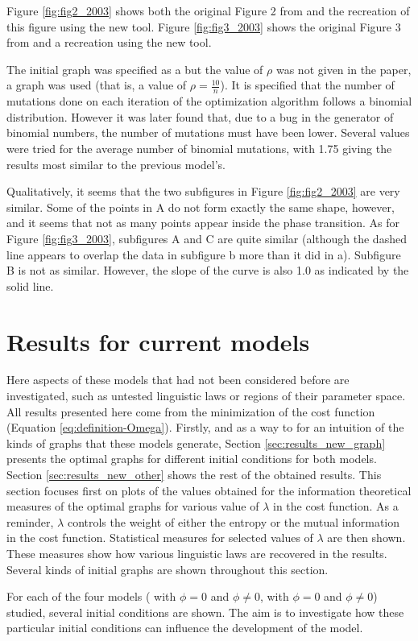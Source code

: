 Figure \ref{fig:fig2_2003} shows both the original Figure 2 from \cite{Ferrer2003a} and the recreation of this figure using the new tool.
Figure \ref{fig:fig3_2003} shows the original Figure 3 from \cite{Ferrer2003a} and a recreation using the new tool.

The initial graph was specified as a  but the value of $\rho$ was not given in the paper, a  graph was used (that is, a value of $\rho=\frac{10}{n}$).
It is specified that the number of mutations done on each iteration of the optimization algorithm follows a binomial distribution.
However it was later found that, due to a bug in the generator of binomial numbers, the number of mutations must have been lower.
Several values were tried for the average number of binomial mutations, with 1.75 giving the results most similar to the previous model's.

Qualitatively, it seems that the two subfigures in Figure \ref{fig:fig2_2003} are very similar.
Some of the points in A do not form exactly the same shape, however, and it seems that not as many points appear inside the phase transition.
As for Figure \ref{fig:fig3_2003}, subfigures A and C are quite similar (although the dashed line appears to overlap the data in subfigure b more than it did in a).
Subfigure B is not as similar.
However, the slope of the curve is also 1.0 as indicated by the solid line.

\section{Results for current models}
\label{sec:results_new}

Here aspects of these models that had not been considered before are investigated, such as untested linguistic laws or regions of their parameter space.
All results presented here come from the minimization of the cost function (Equation \eqref{eq:definition-Omega}).
Firstly, and as a way to for an intuition of the kinds of graphs that these models generate, Section \ref{sec:results_new_graph} presents the optimal graphs for different initial conditions for both models.
Section \ref{sec:results_new_other} shows the rest of the obtained results.
This section focuses first on plots of the values obtained for the information theoretical measures of the optimal graphs for various value of $\lambda$ in the cost function.
As a reminder, $\lambda$ controls the weight of either the entropy or the mutual information in the cost function.
Statistical measures for selected values of $\lambda$ are then shown.
These measures show how various linguistic laws are recovered in the results.
Several kinds of initial graphs are shown throughout this section.
\begin{redenv}
  For each of the four models (\firstmodel{} with $\phi=0$ and $\phi\neq 0$, \secondmodel with $\phi=0$ and $\phi\neq 0$) studied, several initial conditions are shown.
  The aim is to investigate how these particular initial conditions can influence the development of the model.
\end{redenv}

